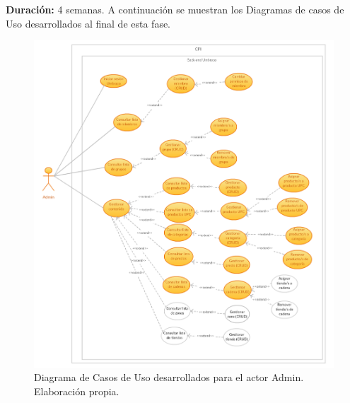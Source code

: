 \textbf{Duración:} 4 semanas.
\vskip 0.5cm
A continuación se muestran los Diagramas de casos de Uso desarrollados al final de esta fase.

\begin{figure}[H]
    \begin{center}
    \includegraphics[width=\textwidth]{cu_admin.png}
    \caption{Diagrama de Casos de Uso desarrollados para el actor Admin. Elaboración propia.}
    \label{fig:cu_admin}
    \end{center}
\end{figure}

